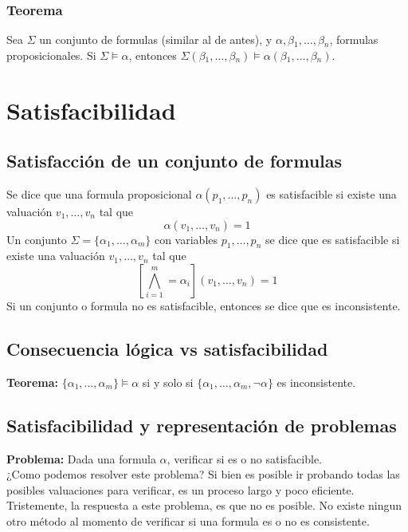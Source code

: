 \documentclass{article}
\begin{document}
\subsubsection{Teorema}
Sea $\Sigma$ un conjunto de formulas (similar al de antes), y $\alpha{}, \beta{}_{1}, \ldots{}, \beta{}_{n}$, formulas proposicionales. Si $\Sigma{} \models{} \alpha{}$, entonces $\Sigma{}(\beta{}_{1}, \ldots{}, \beta{}_{n}) \models{} \alpha{}(\beta{}_{1}, \ldots{}, \beta{}_{n})$.

\section{Satisfacibilidad}
\subsection{Satisfacción de un conjunto de formulas}
Se dice que una formula proposicional $\alpha(p_{1}, \ldots{}, p_{n})$ es satisfacible si existe una valuación $v_{1}, \ldots{}, v_{n}$ tal que
$$\alpha{}(v_{1}, \ldots{}, v_{n}) = 1$$
Un conjunto $\Sigma = \{ \alpha{}_{1}, \ldots{}, \alpha{}_{m} \}$ con variables $p_{1}, \ldots{}, p_{n}$ se dice que es satisfacible si existe una valuación $v_{1}, \ldots{}, v_{n}$ tal que
$$[ \bigwedge_{i = 1}^{m} = \alpha{}_{i} ] (v_{1}, \ldots{}, v_{n}) = 1$$
Si un conjunto o formula no es satisfacible, entonces se dice que es inconsistente.\\

\subsection{Consecuencia lógica vs satisfacibilidad}
\textbf{Teorema:} $\{\alpha{}_{1}, \ldots{}, \alpha{}_{m}\} \models{} \alpha{}$ si y solo si $\{ \alpha{}_{1}, \ldots{}, \alpha{}_{m}, \neg{} \alpha \}$ es inconsistente.

\subsection{Satisfacibilidad y representación de problemas}
\textbf{Problema:} Dada una formula $\alpha$, verificar si es o no satisfacible.\\
¿Como podemos resolver este problema? Si bien es posible ir probando todas las posibles valuaciones para verificar, es un proceso largo y poco eficiente. Tristemente, la respuesta a este problema, es que no es posible. No existe ningun otro método al momento de verificar si una formula es o no es consistente.
\end{document}

